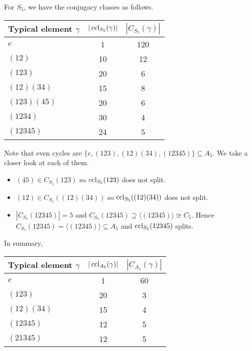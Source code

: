\documentclass[10pt, a4paper, twoside]{report}
\begin{document}
\begin{example}
    For \(S_5\), we have the conjugacy classes as follows.
    \begin{table}[H]
        \centering
        \begin{tabularx}{0.6\textwidth}{Xcc}
            \toprule
            Typical element \(\gamma\) & \(|\operatorname{ccl}_{S_5}(\gamma)|\) & \(|C_{S_5}(\gamma)|\) \\
            \midrule
            \(e\) & 1 & 120 \\
            \((12)\) & 10 & 12 \\
            \((123)\) & 20 & 6 \\
            \((12)(34)\) & 15 & 8 \\
            \((123)(45)\) & 20 & 6 \\
            \((1234)\) & 30 & 4 \\
            \((12345)\) & 24 & 5 \\
            \bottomrule 
        \end{tabularx}
    \end{table}
    Note that even cycles are \(\{e,(123),(12)(34),(12345)\}\subseteq A_5\). We take a closer look at each of them.
    \begin{itemize}
        \item \((45)\in C_{S_5}(123)\) so \(\operatorname{ccl}_{S_5}(123)\) does not split.
        \item \((12)\in C_{S_5}((12)(34))\) so \(\operatorname{ccl}_{S_5}((12)(34))\) does not split.
        \item \(|C_{S_5}(12345)|=5\) and \(C_{S_5}(12345)\supseteq\langle(12345)\rangle\cong C_5\). Hence \(C_{S_5}(12345)=\langle (12345)\rangle\subseteq A_5\)
         and \(\operatorname{ccl}_{S_5}(12345)\) splits.
    \end{itemize}
    In summary,
    \begin{table}[H]
        \centering
        \begin{tabularx}{0.6\textwidth}{Xcc}
            \toprule
            Typical element \(\gamma\) & \(|\operatorname{ccl}_{A_5}(\gamma)|\) & \(|C_{A_5}(\gamma)|\) \\
            \midrule
            \(e\) & 1 & 60 \\
            \((123)\) & 20 & 3 \\
            \((12)(34)\) & 15 & 4 \\
            \((12345)\) & 12 & 5 \\
            \((21345)\) & 12 & 5 \\
            \bottomrule 
        \end{tabularx}
    \end{table}
\end{example}
\end{document}
